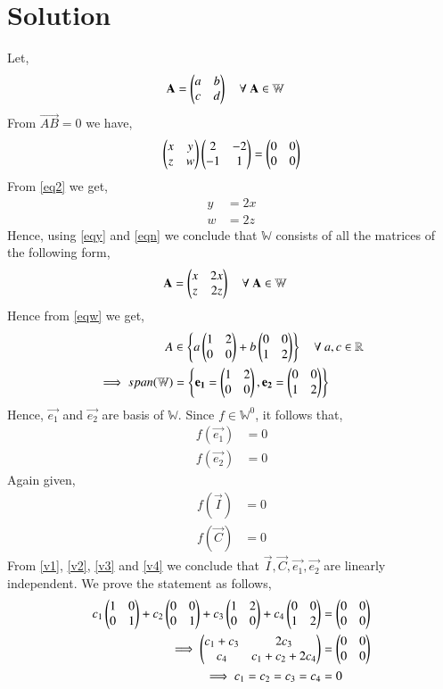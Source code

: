 \documentclass[journal,12pt,twocolumn]{IEEEtran}
\begin{document}
\section{\textbf{Solution}}
Let,
\begin{align}
\mathbf{A} &= \begin{pmatrix}a&b\\c&d\end{pmatrix} \quad{\text{$\forall$ $\mathbf{A} \in \mathbb{W}$}}
\end{align}
From $\vec{AB} = 0$ we have,
\begin{align}
\begin{pmatrix}x&y\\z&w\end{pmatrix}\begin{pmatrix}2&-2\\-1&1\end{pmatrix} = \begin{pmatrix}0&0\\0&0\end{pmatrix}\label{eq2}
\end{align}
From \eqref{eq2} we get,
\begin{align}
y &= 2x\label{eqy}\\
w &= 2z\label{eqn}
\end{align}
Hence, using \eqref{eqy} and \eqref{eqn} we conclude that $\mathbb{W}$ consists of all the matrices of the following form,
\begin{align}
\mathbf{A} &= \begin{pmatrix}x&2x\\z&2z\end{pmatrix} \quad{\text{$\forall$ $\mathbf{A} \in \mathbb{W}$}}\label{eqw}
\end{align}
Hence from \eqref{eqw} we get,
\begin{align}
A &\in \left\{a\begin{pmatrix}1&2\\0&0\end{pmatrix}+b\begin{pmatrix}0&0\\1&2\end{pmatrix}\right\} \quad{\text{$\forall$ $a,c \in \mathbb{R}$}}\\
\implies span(\mathbb{W}) &= \left\{\mathbf{e_1} = \begin{pmatrix}1&2\\0&0\end{pmatrix}, \mathbf{e_2} = \begin{pmatrix}0&0\\1&2\end{pmatrix}\right\}
\end{align}
Hence, $\vec{e_1}$ and $\vec{e_2}$ are basis of $\mathbb{W}$.
Since $f \in \mathbb{W}^0$, it follows that,
\begin{align}
f(\vec{e_1}) &= 0\label{v1}\\
f(\vec{e_2}) &= 0\label{v2}
\end{align}
Again given,
\begin{align}
f(\vec{I}) &= 0\label{v3}\\
f(\vec{C}) &= 0\label{v4}
\end{align}
From \eqref{v1}, \eqref{v2}, \eqref{v3} and \eqref{v4} we conclude that $\vec{I},\vec{C},\vec{e_1}, \vec{e_2}$ are linearly independent. We prove the statement as follows,
\begin{align}
c_1\begin{pmatrix}1&0\\0&1\end{pmatrix}+c_2\begin{pmatrix}0&0\\0&1\end{pmatrix}+c_3\begin{pmatrix}1&2\\0&0\end{pmatrix}+c_4\begin{pmatrix}0&0\\1&2\end{pmatrix} &= \begin{pmatrix}0&0\\0&0\end{pmatrix}\\
\implies \begin{pmatrix}c_1+c_3&2c_3\\c_4&c_1+c_2+2c_4\end{pmatrix} &= \begin{pmatrix}0&0\\0&0\end{pmatrix}\\
\implies c_1 = c_2 = c_3 = c_4 &= 0\label{ind}
\end{align}
\end{document}
